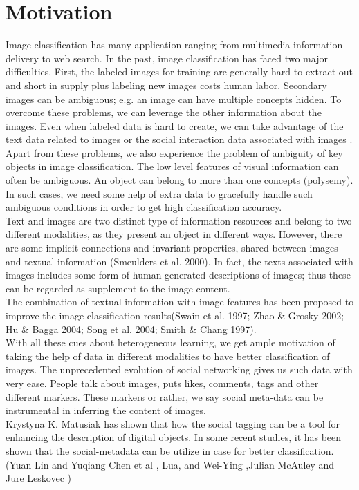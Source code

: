 \section{Motivation}
Image classification has many application ranging from multimedia information delivery to web search. In the past, image classification has faced two major difficulties. First, the labeled images for training are generally hard to extract out and short in supply plus labeling new images costs human labor. Secondary images can be ambiguous; e.g. an image can have multiple concepts hidden. To overcome these problems, we can leverage the other information about the images. Even when labeled data is hard to create, we can take advantage of the text data related to images or the social interaction data associated with images \cite{heterogenous}.\\
\hspace*{1cm} Apart from these problems, we also experience the problem of ambiguity of key objects in image classification. The low level features of visual information can often be ambiguous. An object can belong to more than one concepts (polysemy). In such cases, we need some help of extra data to gracefully handle such ambiguous conditions in order to get high classification accuracy.\\
\hspace*{1cm} Text and images are two distinct type of information resources and belong to two different modalities, as they present an object in different ways. However, there are some implicit connections and invariant properties, shared between images and textual information (Smeulders et al. 2000). In fact, the texts associated with images includes some form of human generated descriptions of images; thus these can be regarded as supplement to the image content.\\
\hspace*{1cm} The combination of textual information with image features has been proposed to improve the image classification results(Swain et al. 1997; Zhao \& Grosky 2002; Hu \& Bagga 2004; Song et al. 2004; Smith \& Chang 1997). \\
\hspace*{1cm} With all these cues about heterogeneous learning, we get ample motivation of taking the help of data in different modalities to have better classification of images. The unprecedented evolution of social networking gives us such data with very ease. People talk about images, puts likes, comments, tags and other different markers. These markers or rather,  we say social meta-data can be instrumental in inferring the content of images.\\
 \hspace*{1cm} Krystyna K. Matusiak has shown that how the social tagging can be a tool for enhancing the description of digital objects\cite{digiImage}. In some recent studies, it has been shown that the social-metadata can be utilize in case for better classification. (Yuan Lin and Yuqiang Chen et al \cite{heterogenous}, Lua, and Wei-Ying \cite{liu},Julian McAuley and Jure Leskovec \cite{McAuley} )\\